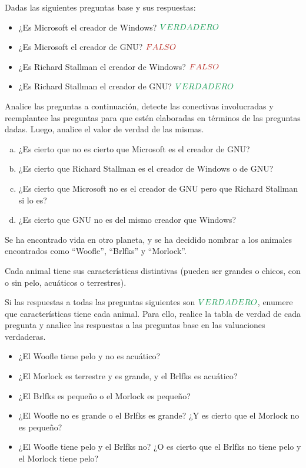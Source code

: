 \begin{exercise}
    Dadas las siguientes preguntas base y sus respuestas:
    \begin{itemize}
        \item ¿Es Microsoft el creador de Windows? $\ltruefull$
        \item ¿Es Microsoft el creador de GNU? $\lfalsefull$
        \item ¿Es Richard Stallman el creador de Windows? $\lfalsefull$
        \item ¿Es Richard Stallman el creador de GNU? $\ltruefull$
    \end{itemize}

    Analice las preguntas a continuación, detecte las conectivas involucradas y
    reemplantee las preguntas para que estén elaboradas en términos de las
    preguntas dadas. Luego, analice el valor de verdad de las mismas.

    \begin{enumerate}[a)]
        \item ¿Es cierto que no es cierto que Microsoft es el creador de GNU?
        \item ¿Es cierto que Richard Stallman es el creador de Windows o de GNU?
        \item ¿Es cierto que Microsoft no es el creador de GNU pero que Richard
        Stallman si lo es?
        \item ¿Es cierto que GNU no es del mismo creador que Windows?
    \end{enumerate}
\end{exercise}

\begin{exercise}
    Se ha encontrado vida en otro planeta, y se ha decidido nombrar a los
    animales encontrados como ``Woofle'', ``Brlfks'' y ``Morlock''.

    Cada animal tiene sus características distintivas (pueden ser grandes o
    chicos, con o sin pelo, acuáticos o terrestres).

    Si las respuestas a todas las preguntas siguientes son $\ltruefull$, enumere
    que características tiene cada animal. Para ello, realice la tabla de verdad
    de cada pregunta y analice las respuestas a las preguntas base en las
    valuaciones verdaderas.

    \begin{itemize}
      \item ¿El Woofle tiene pelo y no es acuático?
      \item ¿El Morlock es terrestre y es grande, y el Brlfks es acuático?
      \item ¿El Brlfks es pequeño o el Morlock es pequeño?
      \item ¿El Woofle no es grande o el Brlfks es grande? ¿Y es cierto que el
      Morlock no es pequeño?
      \item ¿El Woofle tiene pelo y el Brlfks no? ¿O es cierto que el Brlfks no
      tiene pelo y el Morlock tiene pelo?
    \end{itemize}
\end{exercise}